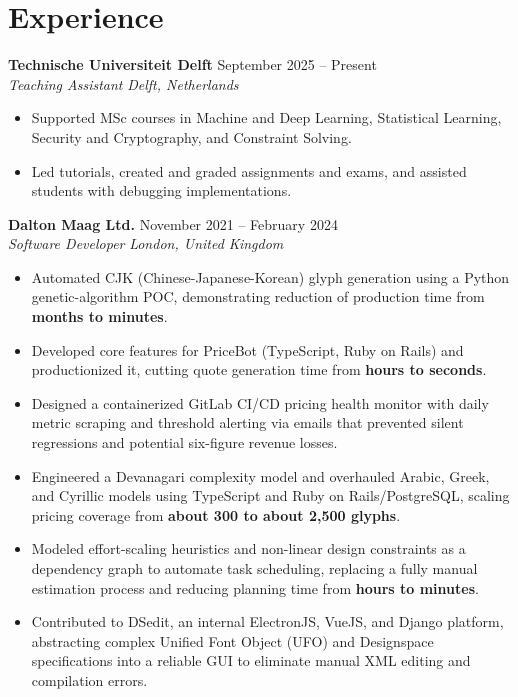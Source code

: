 \documentclass[10pt,a4paper]{article}
\newcommand{\resumeheading}[4]{%
  \textbf{#1} \hfill #2\\[-0.15em]
  \textit{#3} \hfill \textit{#4}\\[-1.5em]
}
\begin{document}
\section*{Experience}

\resumeheading{Technische Universiteit Delft}{September 2025 -- Present}{Teaching Assistant}{Delft, Netherlands}
\begin{itemize}
	\item Supported MSc courses in Machine and Deep Learning, Statistical Learning, Security and Cryptography, and Constraint Solving.
	\item Led tutorials, created and graded assignments and exams, and assisted students with debugging implementations.
\end{itemize}

\resumeheading{Dalton Maag Ltd.}{November 2021 -- February 2024}{Software Developer}{London, United Kingdom}
\begin{itemize}
	\item Automated CJK (Chinese-Japanese-Korean) glyph generation using a Python genetic-algorithm POC, demonstrating reduction of production time from \textbf{months to minutes}.
	\item Developed core features for PriceBot (TypeScript, Ruby on Rails) and productionized it, cutting quote generation time from \textbf{hours to seconds}.
	\item Designed a containerized GitLab CI/CD pricing health monitor with daily metric scraping and threshold alerting via emails that prevented silent regressions and potential six-figure revenue losses.
	\item Engineered a Devanagari complexity model and overhauled Arabic, Greek, and Cyrillic models using TypeScript and Ruby on Rails/PostgreSQL, scaling pricing coverage from \textbf{about 300 to about 2,500 glyphs}.
	\item Modeled effort-scaling heuristics and non-linear design constraints as a dependency graph to automate task scheduling, replacing a fully manual estimation process and reducing planning time from \textbf{hours to minutes}.
	\item Contributed to DSedit, an internal ElectronJS, VueJS, and Django platform, abstracting complex Unified Font Object (UFO) and Designspace specifications into a reliable GUI to eliminate manual XML editing and compilation errors.
\end{itemize}
\end{document}
